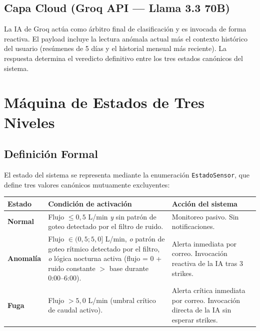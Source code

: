 \documentclass[12pt,a4paper]{article}
\begin{document}
\subsection{Capa Cloud (Groq API — Llama 3.3 70B)}

La IA de Groq actúa como árbitro final de clasificación y es invocada de forma reactiva. El payload incluye la lectura anómala actual más el contexto histórico del usuario (resúmenes de 5 días y el historial mensual más reciente). La respuesta determina el veredicto definitivo entre los tres estados canónicos del sistema.

\section{Máquina de Estados de Tres Niveles}

\subsection{Definición Formal}

El estado del sistema se representa mediante la enumeración \texttt{EstadoSensor}, que define tres valores canónicos mutuamente excluyentes:

\begin{center}
\begin{tabularx}{0.9\textwidth}{>{\bfseries}lXX}
    \toprule
    \textbf{Estado} & \textbf{Condición de activación} & \textbf{Acción del sistema} \\
    \midrule
    \textcolor{estadoNormal}{Normal} &
        Flujo $\leq 0{,}5$ L/min \textit{y} sin patrón de goteo detectado por el filtro de ruido. &
        Monitoreo pasivo. Sin notificaciones. \\
    \addlinespace
    \textcolor{estadoAnomalia}{Anomalía} &
        Flujo $\in (0{,}5; 5{,}0]$ L/min, \textit{o} patrón de goteo rítmico detectado por el filtro, \textit{o} lógica nocturna activa (flujo = 0 + ruido constante $>$ base durante 0:00--6:00). &
        Alerta inmediata por correo. Invocación reactiva de la IA tras 3 strikes. \\
    \addlinespace
    \textcolor{estadoFuga}{Fuga} &
        Flujo $> 5{,}0$ L/min (umbral crítico de caudal activo). &
        Alerta crítica inmediata por correo. Invocación directa de la IA sin esperar strikes. \\
    \bottomrule
\end{tabularx}
\end{center}
\end{document}
